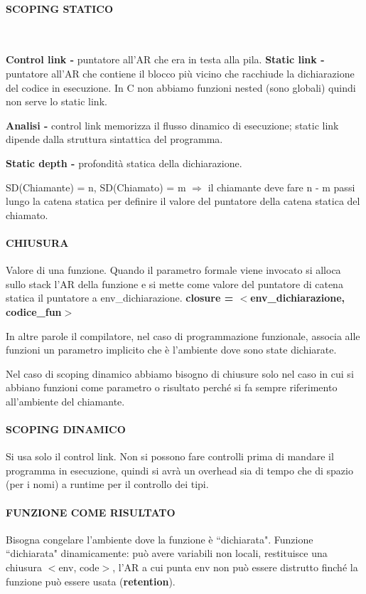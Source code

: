 \documentclass[a4paper, 12pt]{article}
\begin{document}
\paragraph{SCOPING STATICO} \ 

\textbf{Control link -} puntatore all'AR che era in testa alla pila. \textbf{Static link -}
puntatore all'AR che contiene il blocco più vicino che racchiude la dichiarazione del codice
in esecuzione. 
In C non abbiamo funzioni nested (sono globali) quindi non serve lo static link.

\textbf{Analisi -} control link memorizza il flusso dinamico di esecuzione;
static link dipende dalla struttura sintattica del programma. 

\textbf{Static depth -} profondità statica della dichiarazione.

\noindent SD(Chiamante) = n, SD(Chiamato) = m  $\Rightarrow$ il chiamante deve fare n - m
passi lungo la catena statica per definire il valore del puntatore della catena statica del
chiamato.

\paragraph{CHIUSURA}
Valore di una funzione. Quando il parametro formale viene invocato si alloca sullo stack
l'AR della funzione e si mette come valore del puntatore di catena statica il puntatore a
env\_dichiarazione. \textbf{closure = $<$env\_dichiarazione, codice\_fun$>$}

In altre parole il compilatore, nel caso di programmazione funzionale, associa alle funzioni
un parametro implicito che è l'ambiente dove sono state dichiarate.

Nel caso di scoping dinamico abbiamo bisogno di chiusure solo nel caso in cui si abbiano
funzioni come parametro o risultato perché si fa sempre riferimento all'ambiente del
chiamante.

\paragraph{SCOPING DINAMICO}
Si usa solo il control link. Non si possono fare controlli prima di mandare il programma in
esecuzione, quindi si avrà un overhead sia di tempo che di spazio (per i nomi) a runtime per
il controllo dei tipi.

\paragraph{FUNZIONE COME RISULTATO}
Bisogna congelare l'ambiente dove la funzione è ``dichiarata". Funzione ``dichiarata"
dinamicamente: può avere variabili non locali, restituisce una chiusura $<$env, code$>$, l'AR
a cui punta env non può essere distrutto finché la funzione può essere usata
(\textbf{retention}).
\end{document}
